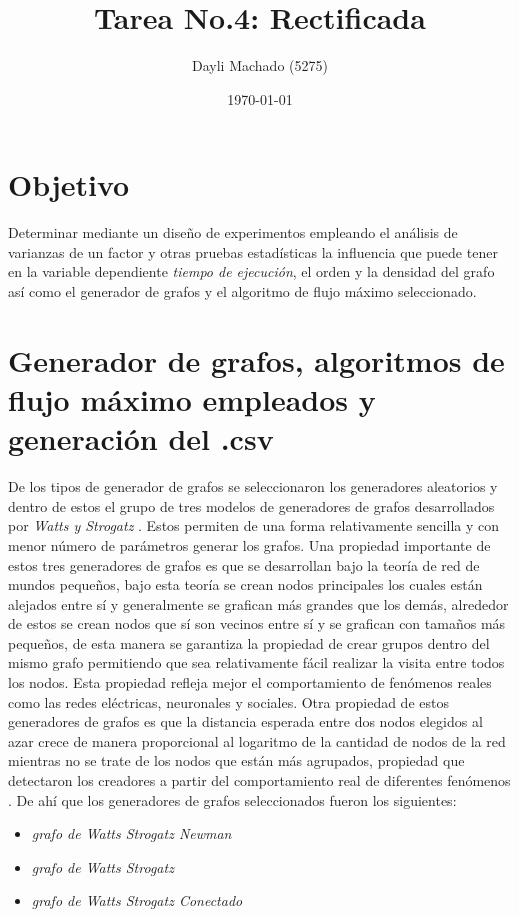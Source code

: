 \documentclass{article}
\begin{document}
\title{Tarea No.4: Rectificada}
\author{Dayli Machado (5275)}
\date{\today}
\maketitle

\section{Objetivo}

Determinar mediante un diseño de experimentos empleando el análisis de varianzas de un factor y otras pruebas estadísticas la influencia que puede tener en la variable dependiente\textit{ tiempo de ejecución}, el  orden y la densidad del grafo así como el generador de grafos y el algoritmo de flujo máximo seleccionado.

\section{Generador de grafos, algoritmos de flujo máximo empleados y generación del .csv }

De los tipos de generador de grafos se seleccionaron los generadores aleatorios y dentro de estos el grupo de tres modelos de generadores de grafos desarrollados por \textit{Watts y Strogatz} \cite{generadoraws}. Estos permiten de una forma relativamente sencilla y con menor número de parámetros generar los grafos. Una propiedad importante de estos tres generadores de grafos es que se desarrollan bajo la teoría de red de mundos pequeños, bajo esta teoría se crean nodos principales los cuales están alejados entre sí y generalmente se grafican más grandes que los demás, alrededor de estos se crean nodos que sí son vecinos entre sí y se grafican con tamaños más pequeños, de esta manera se garantiza la propiedad de crear grupos dentro del mismo grafo permitiendo que sea relativamente fácil realizar la visita entre todos los nodos. Esta propiedad refleja mejor el comportamiento de fenómenos reales como las redes eléctricas, neuronales y sociales. Otra propiedad de estos generadores de grafos es que la distancia esperada entre dos nodos elegidos al azar crece de manera proporcional al logaritmo de la cantidad de nodos de la red mientras no se trate de los nodos que están más agrupados, propiedad que detectaron los creadores a partir del comportamiento real de diferentes fenómenos \cite{wys}. De ahí que los generadores de grafos seleccionados fueron los siguientes:

\begin{itemize}
\item \textit{grafo de Watts Strogatz Newman }
\item \textit{grafo de Watts Strogatz }
\item \textit{grafo de Watts Strogatz Conectado}
\end{itemize}
%
\end{document}
